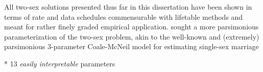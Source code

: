 All two-sex solutions presented thus far in this dissertation have been shown in
terms of rate and data schedules commensurable with lifetable methods and meant
for rather finely graded empirical application. \citet{marriage1981warren,
sanderson1983two} sought a more parsimonious parameterization of the two-sex
problem, akin to the well-known and (extremely) parsimonious 3-parameter
Coale-McNeil model for estimating single-sex marriage
\citep{coale1972distribution, coale1971age}

* 13 \textit{easily interpretable} parameters


\citet{bergstrom1994sweden}


